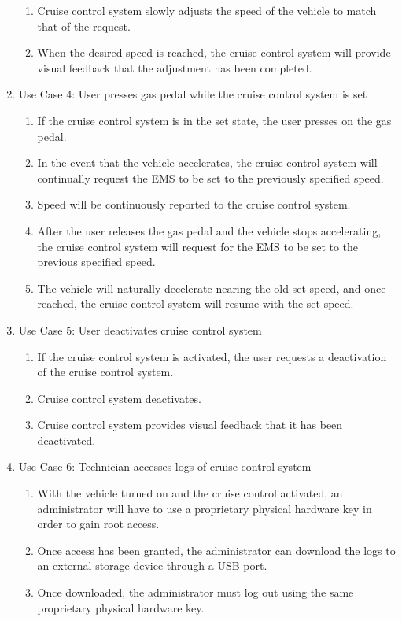 \documentclass[preprint,11pt,3p]{article}
\begin{document}
\begin{enumerate}
\begin{enumerate}
			\item Cruise control system slowly adjusts the speed of the vehicle to match that of the request.
			\item When the desired speed is reached, the cruise control system will provide visual feedback that the adjustment has been completed.
		\end{enumerate}
	\item Use Case 4: User presses gas pedal while the cruise control system is set
		\begin{enumerate}
			\item If the cruise control system is in the set state, the user presses on the gas pedal.
			\item In the event that the vehicle accelerates, the cruise control system will continually request the EMS to be set to the previously specified speed.
			\item Speed will be continuously reported to the cruise control system.
			\item After the user releases the gas pedal and the vehicle stops accelerating, the cruise control system will request for the EMS to be set to the previous specified speed.
			\item The vehicle will naturally decelerate nearing the old set speed, and once reached, the cruise control system will resume with the set speed.
		\end{enumerate}
	\item Use Case 5: User deactivates cruise control system
		\begin{enumerate}
			\item If the cruise control system is activated, the user requests a deactivation of the cruise control system.
			\item Cruise control system deactivates.
			\item Cruise control system provides visual feedback that it has been deactivated.
		\end{enumerate}
	\item Use Case 6: Technician accesses logs of cruise control system
		\begin{enumerate}
			\item With the vehicle turned on and the cruise control activated, an administrator will have to use a proprietary physical hardware key in order to gain root access.
			\item Once access has been granted, the administrator can download the logs to an external storage device through a USB port.
			\item Once downloaded, the administrator must log out using the same proprietary physical hardware key.
		\end{enumerate}
\end{enumerate}
\end{document}
